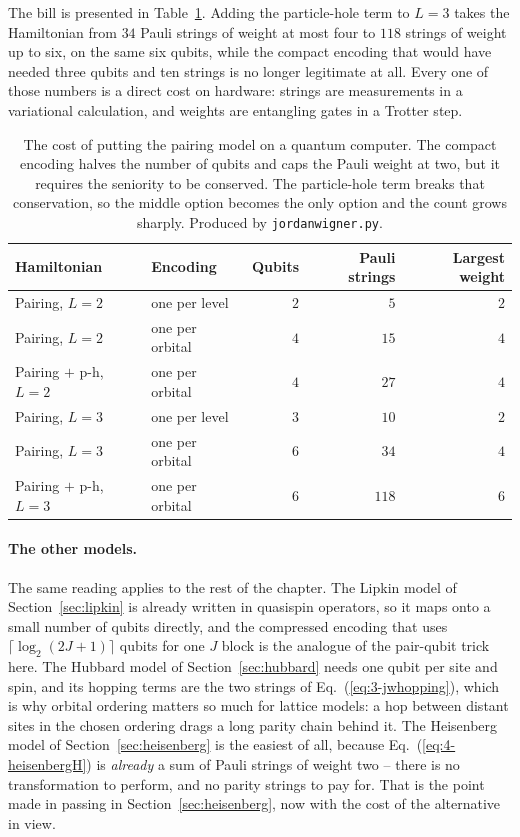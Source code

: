 The bill is presented in Table~\ref{tab:4-paulicounts}.  Adding the
particle-hole term to $L=3$ takes the Hamiltonian from $34$ Pauli strings of
weight at most four to $118$ strings of weight up to six, on the same six
qubits, while the compact encoding that would have needed three qubits and ten
strings is no longer legitimate at all.  Every one of those numbers is a
direct cost on hardware: strings are measurements in a variational
calculation, and weights are entangling gates in a Trotter step.

\begin{table}[h]
\centering
\renewcommand{\arraystretch}{1.25}
\setlength{\tabcolsep}{9pt}
\begin{tabular}{llrrr}
\toprule
\textbf{Hamiltonian} & \textbf{Encoding} & \textbf{Qubits} &
\textbf{Pauli strings} & \textbf{Largest weight}\\
\midrule
Pairing, $L=2$        & one per level   & $2$ & $5$   & $2$\\
Pairing, $L=2$        & one per orbital & $4$ & $15$  & $4$\\
Pairing $+$ p-h, $L=2$ & one per orbital & $4$ & $27$  & $4$\\
\midrule
Pairing, $L=3$        & one per level   & $3$ & $10$  & $2$\\
Pairing, $L=3$        & one per orbital & $6$ & $34$  & $4$\\
Pairing $+$ p-h, $L=3$ & one per orbital & $6$ & $118$ & $6$\\
\bottomrule
\end{tabular}
\caption{The cost of putting the pairing model on a quantum computer.  The
compact encoding halves the number of qubits and caps the Pauli weight at two,
but it requires the seniority to be conserved.  The particle-hole term breaks
that conservation, so the middle option becomes the only option and the count
grows sharply.  Produced by \texttt{jordanwigner.py}.}
\label{tab:4-paulicounts}
\end{table}

\paragraph{The other models.}
The same reading applies to the rest of the chapter.  The Lipkin model of
Section~\ref{sec:lipkin} is already written in quasispin operators, so it maps
onto a small number of qubits directly, and the compressed encoding that uses
$\lceil\log_2(2J+1)\rceil$ qubits for one $J$ block is the analogue of the
pair-qubit trick here.  The Hubbard model of Section~\ref{sec:hubbard} needs
one qubit per site and spin, and its hopping terms are the two strings of
Eq.~(\ref{eq:3-jwhopping}), which is why orbital ordering matters so much for
lattice models: a hop between distant sites in the chosen ordering drags a
long parity chain behind it.  The Heisenberg model of
Section~\ref{sec:heisenberg} is the easiest of all, because
Eq.~(\ref{eq:4-heisenbergH}) is \emph{already} a sum of Pauli strings of
weight two -- there is no transformation to perform, and no parity strings to
pay for.  That is the point made in passing in
Section~\ref{sec:heisenberg}, now with the cost of the alternative in view.

